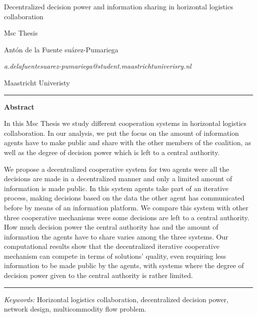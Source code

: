 \documentclass{article}
\begin{document}

\begin{center}

{\Large Decentralized decision power and information sharing in horizontal logistics collaboration} \\\medskip

Msc Thesis
\bigskip

Antón de la Fuente suárez-Pumariega
\medskip

\textit{a.delafuentesuarez-pumariega@student.maastrichtuniverisry.nl}
\bigskip

Maastricht Univeristy
\end{center}
\vspace{1cm}

\hrule
\medskip


\noindent\textbf{Abstract}
\medskip

\noindent In this Msc Thesis we study different cooperation systems in horizontal logistics collaboration. In our analysis, we put the focus on the amount of information agents have to make public and share with the other members of the coalition, as well as the degree of decision power which is left to a central authority. 

We propose a decentralized cooperative system for two agents were all the decisions are made in a decentralized manner and only a limited amount of information is made public. In this system agents take part of an iterative process, making decisions based on the data the other agent has communicated before by means of an information platform. We compare this system with other three cooperative mechanisms were some decisions are left to a central authority. How much decision power the central authority has and the amount of information the agents have to share varies among the three systems. Our computational results show that the decentralized iterative cooperative mechanism can compete in terms of solutions' quality, even requiring less information to be made public by the agents, with systems where the degree of decision power given to the central authority is rather limited.


\bigskip
\hrule
\bigskip

\textit{Keywords:} Horizontal logistics collaboration, decentralized decision power, network design, multicommodity flow problem.
\end{document}
